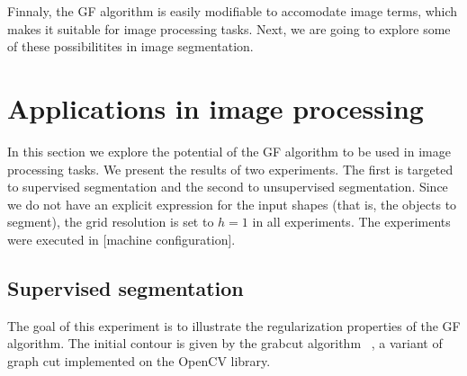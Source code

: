 \documentclass[smallextended]{svjour3}
\begin{document}
Finnaly, the GF algorithm is easily modifiable to accomodate image terms, which makes it suitable for image processing tasks. Next, we are going to explore some of these possibilitites in image segmentation.

\section{Applications in image processing}


In this section we explore the potential of the GF algorithm to be used in image processing tasks. We present the results of two experiments. The first is targeted to supervised segmentation and the second to unsupervised segmentation. Since we do not have an explicit expression for the input shapes (that is, the objects to segment), the grid resolution is set to $h=1$ in all experiments. The experiments were executed in [machine configuration].

\subsection{Supervised segmentation}

The goal of this experiment is to illustrate the regularization properties of the GF algorithm. The initial contour is given by the grabcut algorithm ~\cite{rother04grabcut}, a variant of graph cut implemented on the OpenCV library. 
\end{document}
